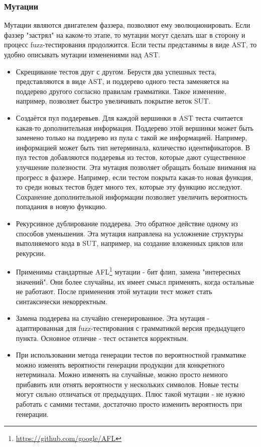 \documentclass[a4paper]{article}
\begin{document}
\subsubsection{Мутации}
\indent

Мутации являются двигателем фаззера, позволяют ему эволюционировать. Если фаззер "застрял" на каком-то этапе, то мутации могут сделать шаг в сторону и процесс fuzz-тестирования продолжится. Если тесты представимы в виде AST, то удобно описывать мутации изменениями над AST. 

\begin{itemize}
\item Скрещивание тестов друг с другом. Берустя два успешных теста, представляются в виде AST, и поддерево одного теста заменяется на поддерево другого согласно правилам грамматики. Такое изменение, например, позволяет быстро увеличивать покрытие веток SUT.   
\item Создаётся пул поддеревьев. Для каждой вершинки в AST теста считается  какая-то дополнительная информация. Поддерево этой вершинки может быть заменено только на поддерево из пула с такой же информацией. Например, информацией может быть тип нетерминала, количество идентификаторов. В пул тестов добавляются поддеревья из тестов, которые дают существенное улучшение полезности. Эта мутация позволяет обращать больше внимания на прогресс в фаззере. Например, если тестом покрыта какая-то новая функция, то среди новых тестов будет много тех, которые эту функцию исследуют. Сохранение дополнительной информации позволяет увеличить вероятность попадания в новую функцию.
\item Рекурсивное дублирование поддерева. Это обратное действие одному из способов уменьшения. Эта мутация направлена на усложнение структуры выполняемого кода в SUT, например, на создание вложенных циклов или рекурсии. 
\item Применимы стандартные AFL\footnote[1]{\href{https://github.com/google/AFL}{https://github.com/google/AFL}} мутации - бит флип, замена "интересных значений". Они более случайны, их имеет смысл применять, когда остальные не работают. После применения этой мутации тест может стать синтаксически некорректным.
\item Замена поддерева на случайно сгенерированное. Эта мутация - адаптированная для fuzz-тестирования с грамматикой версия предыдущего пункта. Основное отличие - тест останется корректным.
\item При использовании метода генерации тестов по вероятностной грамматике можно изменять вероятности генерации продукции для конкретного нетерминала. Можно изменять на случайные, можно просто немного прибавить или отнять вероятности у нескольких символов. Новые тесты могут сильно отличаться от предыдущих. Плюс такой мутации - не нужно работать с самими тестами, достаточно просто изменить вероятность при генерации.  
\end{itemize}
\end{document}
